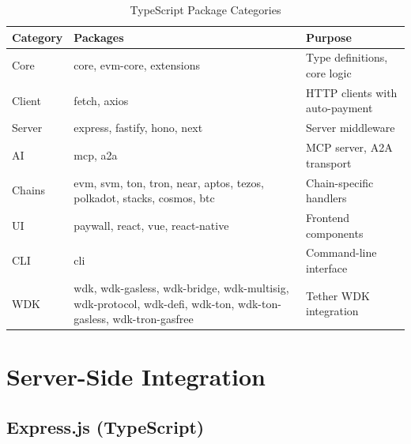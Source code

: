 \begin{table}[htbp]
\centering
\caption{TypeScript Package Categories}
\label{tab:ts-packages}
\footnotesize
\begin{tabular}{l l p{5.5cm}}
\toprule
\textbf{Category} & \textbf{Packages} & \textbf{Purpose} \\
\midrule
Core & core, evm-core, extensions & Type definitions, core logic \\
Client & fetch, axios & HTTP clients with auto-payment \\
Server & express, fastify, hono, next & Server middleware \\
AI & mcp, a2a & MCP server, A2A transport \\
Chains & evm, svm, ton, tron, near, aptos, tezos, polkadot, stacks, cosmos, btc & Chain-specific handlers \\
UI & paywall, react, vue, react-native & Frontend components \\
CLI & cli & Command-line interface \\
WDK & wdk, wdk-gasless, wdk-bridge, wdk-multisig, wdk-protocol, wdk-defi, wdk-ton, wdk-ton-gasless, wdk-tron-gasfree & Tether WDK integration \\
\bottomrule
\end{tabular}
\end{table}

\section{Server-Side Integration}
\label{sec:server-integration}

\subsection{Express.js (TypeScript)}

